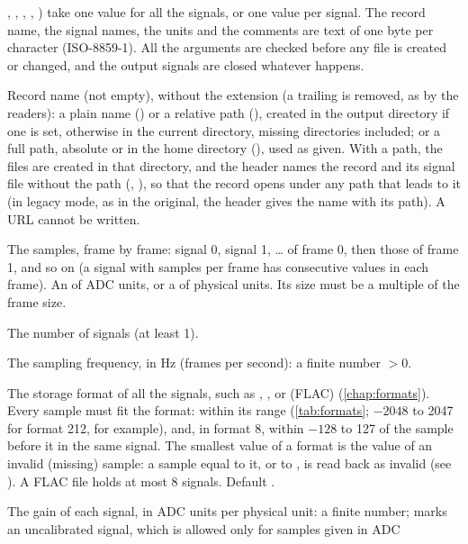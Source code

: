 , , , , ) take one
value for all the signals, or one value per signal. The record name, the signal names, the
units and the comments are text of one byte per character (ISO-8859-1). All the arguments
are checked before any file is created or changed, and the output signals are closed
whatever happens.
\begin{params}
\item[record] Record name (not empty), without the  extension (a trailing
   is removed, as by the readers): a plain name
  () or a relative path (), created in the output directory
  if one is set, otherwise in the current directory, missing directories included; or a
  full path, absolute or in the home directory (),
  used as given. With a path, the files are created in that directory, and the header
  names the record and its signal file without the path (, ), so
  that the record opens under any path that leads to it (in legacy mode, as in the
  original, the header gives the name with its path). A URL cannot be written.
\item[samples] The samples, frame by frame: signal 0, signal 1, \ldots{} of frame 0, then
  those of frame 1, and so on (a signal with  samples per frame has 
  consecutive values in each frame). An  of ADC units, or a
   of physical units. Its size must be a multiple of the frame size.
\item[nsig] The number of signals (at least 1).
\item[fs] The sampling frequency, in Hz (frames per second): a finite number $> 0$.
\item[fmt] The storage format of all the signals, such as , ,
   or  (FLAC) (\cref{chap:formats}). Every sample must fit the
  format: within its range (\cref{tab:formats}; $-2048$ to 2047 for format 212, for
  example), and, in format 8, within $-128$ to 127 of the sample before it in the same
  signal. The smallest value of a format is the value of an invalid (missing) sample: a
  sample equal to it, or to , is read back as invalid (see
  ). A FLAC file holds at most 8 signals. Default .
\item[gains] The gain of each signal, in ADC units per physical unit: a finite number;
   marks an uncalibrated signal, which is allowed only for samples given in ADC

\end{params}
